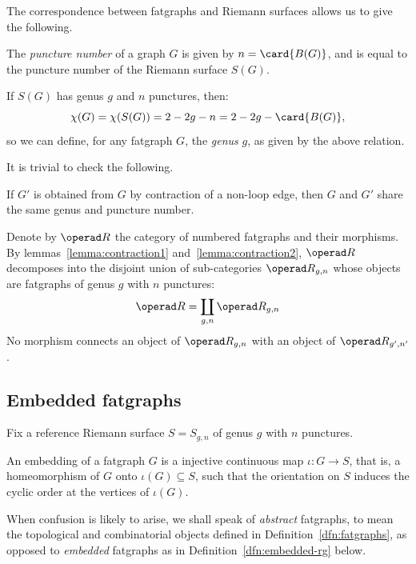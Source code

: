The correspondence between fatgraphs and Riemann surfaces allows
us to give the following.
\begin{definition}\label{dfn:rg-genus}
  The \emph{puncture number} of a graph $G$ is given by $n =
  \card{\Holes{G}}$, and is equal to the puncture number of the
  Riemann surface $S(G)$.

  If $S(G)$ has genus $g$ and $n$ punctures, then:
  \begin{equation}
    \label{eq:euler-characteristics-of-fatgraphs}
    \chi(G) = \chi(S(G)) = 2 - 2g - n = 2 - 2g - \card{\Holes{G}},
  \end{equation}
  so we can define, for any fatgraph $G$, the \emph{genus} $g$, as
  given by the above relation.
\end{definition}
It is trivial to check the following.
\begin{lemma}\label{lemma:contraction2}
  If $G'$ is obtained from $G$ by contraction of a non-loop edge,
  then $G$ and $G'$ share the same genus and puncture number.
\end{lemma}
Denote by $\RG$ the category of numbered fatgraphs and their
morphisms.  By lemmas~\ref{lemma:contraction1}
and~\ref{lemma:contraction2}, $\RG$ decomposes into the disjoint union
of sub-categories $\RG_{g,n}$ whose objects are fatgraphs of genus
$g$ with $n$ punctures:
\begin{equation*}
  \RG = \coprod_{g,n} \RG_{g,n}
\end{equation*}
No morphism connects an object of $\RG_{g,n}$ with an object of
$\RG_{g',n'}$.


\subsection{Embedded fatgraphs}
\label{sec:embedded-rg}

Fix a reference Riemann surface $S = S_{g,n}$ of genus $g$ with $n$
punctures.

An embedding of a fatgraph $G$ is a injective continuous map $\iota:G\to
S$, that is, a homeomorphism of $G$ onto $\iota(G) \subseteq S$, such that the
orientation on $S$ induces the cyclic order at the vertices of $\iota(G)$.

When confusion is likely to arise, we shall speak of \emph{abstract}
fatgraphs, to mean the topological and combinatorial objects
defined in Definition~\ref{dfn:fatgraphs}, as opposed to \emph{embedded}
fatgraphs as in Definition~\ref{dfn:embedded-rg} below.


